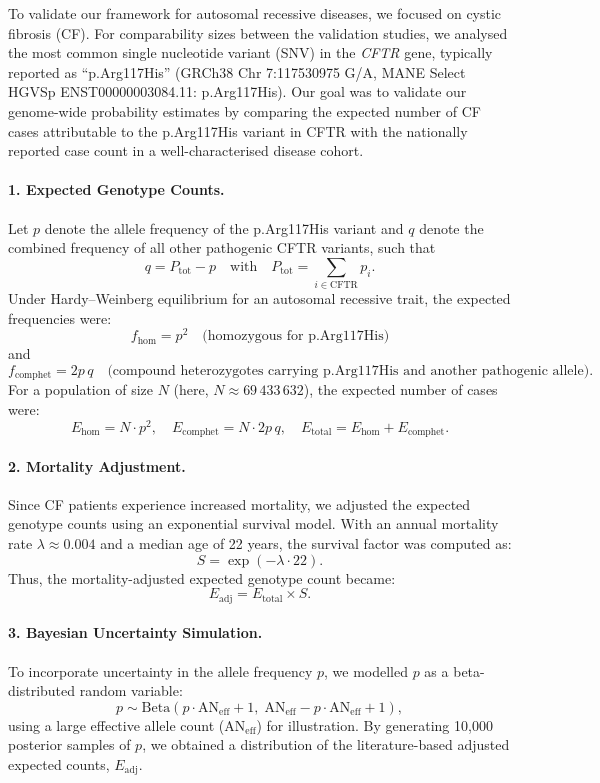 To validate our framework for autosomal recessive diseases, we focused on cystic fibrosis (CF).
For comparability sizes between the validation studies, we analysed the most common single nucleotide variant (SNV) in the \textit{CFTR} gene, typically reported as ``p.Arg117His'' (GRCh38 Chr 7:117530975 G/A, MANE Select HGVSp ENST00000003084.11: p.Arg117His).
Our goal was to validate our genome-wide probability estimates by comparing the expected number of CF cases attributable to the p.Arg117His variant in CFTR with the nationally reported case count in a well-characterised disease cohort.

\paragraph{1. Expected Genotype Counts.}
Let \( p \) denote the allele frequency of the p.Arg117His variant and \( q \) denote the combined frequency of all other pathogenic CFTR variants, such that
\[
q = P_{\text{tot}} - p \quad \text{with} \quad P_{\text{tot}} = \sum_{i \in \text{CFTR}} p_i.
\]
Under Hardy–Weinberg equilibrium for an autosomal recessive trait, the expected frequencies were:
\[
f_{\text{hom}} = p^2 \quad \text{(homozygous for p.Arg117His)}
\]
and
\[
f_{\text{comphet}} = 2p\,q \quad \text{(compound heterozygotes carrying p.Arg117His and another pathogenic allele)}.
\]
For a population of size \( N \) (here, \( N \approx 69\,433\,632 \)), the expected number of cases were:
\[
E_{\text{hom}} = N \cdot p^2,\quad E_{\text{comphet}} = N \cdot 2p\,q,\quad E_{\text{total}} = E_{\text{hom}} + E_{\text{comphet}}.
\]

\paragraph{2. Mortality Adjustment.}
Since CF patients experience increased mortality, we adjusted the expected genotype counts using an exponential survival model. With an annual mortality rate \(\lambda \approx 0.004\) and a median age of 22 years, the survival factor was computed as:
\[
S = \exp(-\lambda \cdot 22).
\]
Thus, the mortality-adjusted expected genotype count became:
\[
E_{\text{adj}} = E_{\text{total}} \times S.
\]

\paragraph{3. Bayesian Uncertainty Simulation.}
To incorporate uncertainty in the allele frequency \( p \), we modelled \( p \) as a beta-distributed random variable:
\[
p \sim \mathrm{Beta}(p \cdot \text{AN}_{\text{eff}} + 1,\; \text{AN}_{\text{eff}} - p \cdot \text{AN}_{\text{eff}} + 1),
\]
using a large effective allele count (\(\text{AN}_{\text{eff}}\)) for illustration. By generating 10,000 posterior samples of \( p \), we obtained a distribution of the literature-based adjusted expected counts, \(E_{\text{adj}}\).


